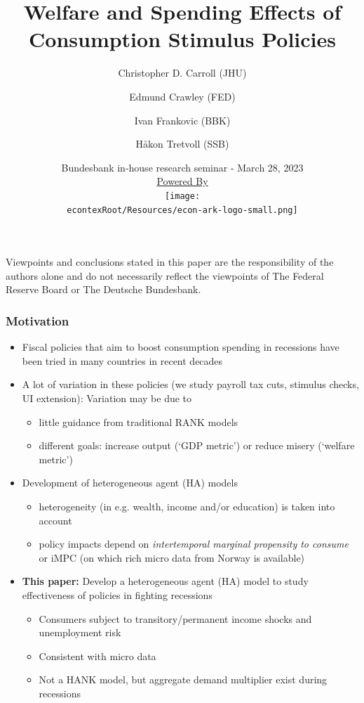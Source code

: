 \documentclass[pdflatex,aspectratio=169]{beamer}
\title[Stimulus]{Welfare and Spending Effects of Consumption Stimulus Policies}
\author{
  Christopher D. Carroll (JHU)
  \and
  Edmund Crawley (FED)
  \and
  Ivan Frankovic (BBK)
  \and
  H{\aa}kon Tretvoll (SSB)
}
\date[\today]{Bundesbank in-house research seminar - March 28, 2023  \\ \medskip \medskip \medskip 
	\href{https://econ-ark.org/}{\small Powered By} \\ \texttt{[image: \\econtexRoot/Resources/econ-ark-logo-small.png]}}
\begin{document}


\begin{frame}[plain]
  \titlepage
  
  \footnotesize{Viewpoints and conclusions stated in this paper are the responsibility of the authors alone and do not necessarily reflect the viewpoints of The Federal Reserve Board or The Deutsche Bundesbank.}
\end{frame}






	
\begin{frame}
\frametitle{Motivation}
\begin{itemize}
	\item Fiscal policies that aim to boost consumption spending in recessions have been tried in many countries in recent decades  
	\item A lot of variation in these policies (we study payroll tax cuts, stimulus checks, UI extension): Variation may be due to
	\begin{itemize}
		\itemsep = .25\bigskipamount 
		\item little guidance from traditional RANK models	
		\item different goals: increase output (`GDP metric') or reduce misery (`welfare metric')
	\end{itemize}
	\bigskip
	\pause
	\item Development of heterogeneous agent (HA) models
		\begin{itemize}
		\itemsep = .25\bigskipamount 
		\item heterogeneity (in e.g. wealth, income and/or education) is taken into account
		\item policy impacts depend on \textit{intertemporal marginal propensity to consume} or iMPC (on which rich micro data from Norway is available)
	\end{itemize}
	\bigskip
	\pause
	\item \textbf{This paper:} Develop a heterogeneous agent (HA) model to study effectiveness of policies in fighting recessions
	\begin{itemize}
		\itemsep = .25\bigskipamount 
		\item Consumers subject to transitory/permanent income shocks and unemployment risk
		\item Consistent with micro data
		\item Not a HANK model, but aggregate demand multiplier exist during recessions
	\end{itemize}
\end{itemize}
\end{frame}
\end{document}
